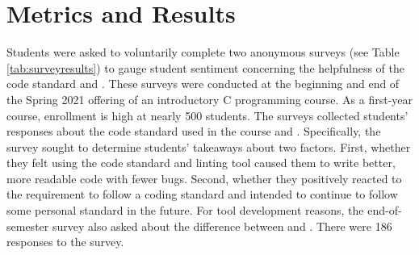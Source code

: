 \documentclass[sigconf]{acmart}
\begin{document}
\section{Metrics and Results}

Students were asked to voluntarily complete two anonymous surveys (see Table \ref{tab:surveyresults}) to gauge student sentiment concerning the helpfulness of 
the code standard and \tool{}. These surveys were conducted at the beginning and end of the Spring
2021 offering of an introductory C programming course. As a first-year course, enrollment is high at nearly 500 students. The surveys
collected students' responses about the code standard
used in the course and \tool{}. Specifically, the survey
sought to determine students' takeaways about two factors. First,
whether they felt using the code standard and linting tool
caused them to write better, more readable code with fewer bugs.
Second, whether they positively reacted to the requirement to follow a coding standard and intended to continue to follow some
personal standard in the future. For tool development reasons, the
end-of-semester survey also asked about the difference between
\tool{} and \oldtool{}. There were 186 responses to the survey.
\end{document}
